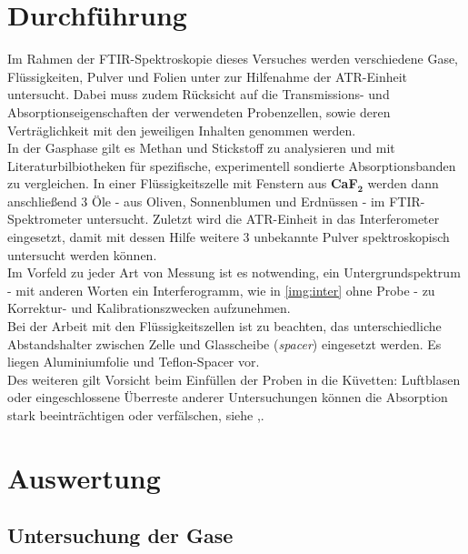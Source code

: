 \documentclass[numbers=noenddot,a4paper,10pt,twocolumn]{article}
\newcommand{\tilt}[1]{\textit{#1}}
\newcommand{\fett}[1]{\textbf{#1}}
\begin{document}
	\section{Durchführung}

		Im Rahmen der FTIR-Spektroskopie dieses Versuches werden verschiedene Gase, Fl\"ussigkeiten, Pulver und Folien unter zur Hilfenahme der ATR-Einheit untersucht. Dabei muss zudem R\"ucksicht auf die Transmissions- und Absorptionseigenschaften der verwendeten Probenzellen, sowie deren Vertr\"aglichkeit mit den jeweiligen Inhalten genommen werden.\\
		In der Gasphase gilt es Methan und Stickstoff zu analysieren und mit Literaturbilbiotheken f\"ur spezifische, experimentell sondierte Absorptionsbanden zu vergleichen. In einer Fl\"ussigkeitszelle mit Fenstern aus \fett{CaF}$_{\fett{2}}$ werden dann anschlie{\ss}end 3 \"Ole - aus Oliven, Sonnenblumen und Erdn\"ussen - im FTIR-Spektrometer untersucht. Zuletzt wird die ATR-Einheit in das Interferometer eingesetzt, damit mit dessen Hilfe weitere 3 unbekannte Pulver spektroskopisch untersucht werden k\"onnen.\\
		Im Vorfeld zu jeder Art von Messung ist es notwending, ein Untergrundspektrum - mit anderen Worten ein Interferogramm, wie in \autoref{img:inter} ohne Probe - zu Korrektur- und Kalibrationszwecken aufzunehmen.\\
		Bei der Arbeit mit den Fl\"ussigkeitszellen ist zu beachten, das unterschiedliche Abstandshalter zwischen Zelle und Glasscheibe (\tilt{spacer}) eingesetzt werden. Es liegen Aluminiumfolie und Teflon-Spacer vor.\\
		Des weiteren gilt Vorsicht beim Einf\"ullen der Proben in die K\"uvetten: Luftblasen oder eingeschlossene \"Uberreste anderer Untersuchungen k\"onnen die Absorption stark beeintr\"achtigen oder verf\"alschen, siehe \cite{FTIRAns},\cite{EMAUGreifswaldFTIR}.

	\section{Auswertung}

		\subsection{Untersuchung der Gase}
\end{document}
